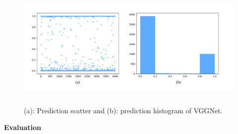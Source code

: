 \documentclass[a4paper]{article}
\begin{document}
\begin{figure}[h]
\centering
\includegraphics[width=15cm,height=6cm]{vgg_best.pdf}
\caption{ (a): Prediction scatter and (b): prediction histogram of \textsf{VGGNet}.}
\label{vggresults}
\end{figure}

\vspace{2mm}
\begin{center}
\large\textbf{Evaluation} \\
\end{center}
\end{document}
